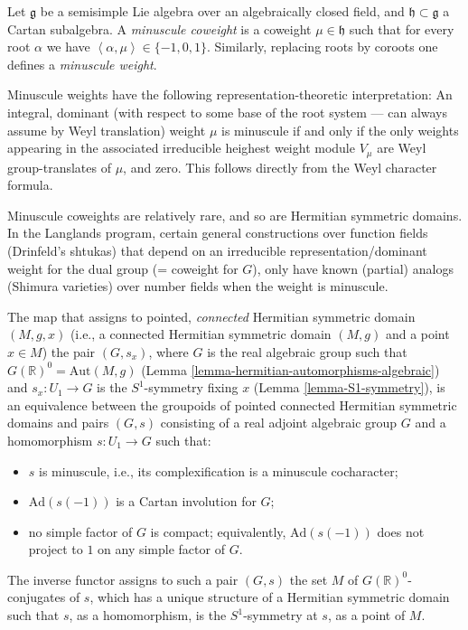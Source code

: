 \begin{definition}
 \label{definition-minuscule-weight}
Let $\mathfrak g$ be a semisimple Lie algebra over an algebraically closed field, and $\mathfrak h\subset \mathfrak g$ a Cartan subalgebra. A {\it minuscule coweight} is a coweight $\mu\in \mathfrak h$ such that for every root $\alpha$ we have $\left< \alpha, \mu\right> \in \{ -1, 0, 1\}$. Similarly, replacing roots by coroots one defines a {\it minuscule weight}.
\end{definition}

\begin{remark}
 \label{remark-minuscule-coweight}
Minuscule weights have the following representation-theoretic interpretation: An integral, dominant (with respect to some base of the root system --- can always assume by Weyl translation) weight $\mu$ is minuscule if and only if the only weights appearing in the associated irreducible heighest weight module $V_\mu$ are Weyl group-translates of $\mu$, and zero. This follows directly from the Weyl character formula.

Minuscule coweights are relatively rare, and so are Hermitian symmetric domains. In the Langlands program, certain general constructions over function fields (Drinfeld's shtukas) that depend on an irreducible representation/dominant weight for the dual group (= coweight for $G$), only have known (partial) analogs (Shimura varieties) over number fields when the weight is minuscule.
\end{remark}


\begin{theorem}
 \label{theorem-classification-hermitian}
The map that assigns to pointed, \emph{connected} Hermitian symmetric domain $(M,g,x)$ (i.e., a connected Hermitian symmetric domain $(M,g)$ and a point $x\in M$) the pair $(G,s_x)$, where $G$ is the real algebraic group such that $G(\mathbb R)^0 = \text{Aut}(M,g)$ (Lemma \ref{lemma-hermitian-automorphisms-algebraic}) and $s_x:U_1\to G$ is the $S^1$-symmetry fixing $x$ (Lemma \ref{lemma-S1-symmetry}), is an equivalence between the groupoids of pointed connected Hermitian symmetric domains and pairs $(G,s)$ consisting of a real adjoint algebraic group $G$ and a homomorphism $s: U_1\to G$ such that:
\begin{itemize}
 \item $s$ is minuscule, i.e., its complexification is a minuscule cocharacter;
 \item $\text{Ad}(s(-1))$ is a Cartan involution for $G$;
 \item no simple factor of $G$ is compact; equivalently, $\text{Ad}(s(-1))$ does not project to $1$ on any simple factor of $G$. 
\end{itemize}
The inverse functor assigns to such a pair $(G,s)$ the set $M$ of $G(\mathbb R)^0$-conjugates of $s$, which has a unique structure of a Hermitian symmetric domain such that $s$, as a homomorphism, is the $S^1$-symmetry at $s$, as a point of $M$.
\end{theorem}


